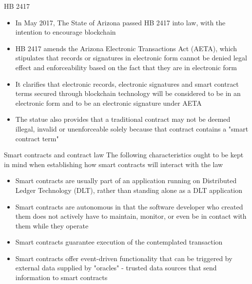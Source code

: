 \documentclass[11pt]{beamer}
\begin{document}


\begin{frame}{HB 2417}
	\begin{itemize}
		\item In May 2017, The State of Arizona passed HB 2417 into law, with the intention to encourage blockchain
		\item HB 2417 amends the Arizona Electronic Transactions Act (AETA), which stipulates that records or signatures in electronic form cannot be denied legal effect and enforceability based on the fact that they are in electronic form
		\item It clarifies that electronic records, electronic signatures and smart contract terms secured through blockchain technology will be considered to be in an electronic form and to be an electronic signature under AETA
		\item The statue also provides that a traditional contract may not be deemed illegal, invalid or unenforceable solely because that contract contains a "smart contract term"
	\end{itemize}
\end{frame}



\begin{frame}{Smart contracts and contract law}
	The following characteristics ought to be kept in mind when establishing how smart contracts will interact with the law
	\begin{itemize}
		\item Smart contracts are usually part of an application running on Distributed Ledger Technology (DLT), rather than standing alone as a DLT application
		\item Smart contracts are autonomous in that the software developer who created them does not actively have to maintain, monitor, or even be in contact with them while they operate
		\item Smart contracts guarantee execution of the contemplated transaction
		\item Smart contracts offer event-driven functionality that can be triggered by external data  supplied by "oracles" - trusted data sources that send information to smart contracts
	\end{itemize}
\end{frame}
\end{document}
